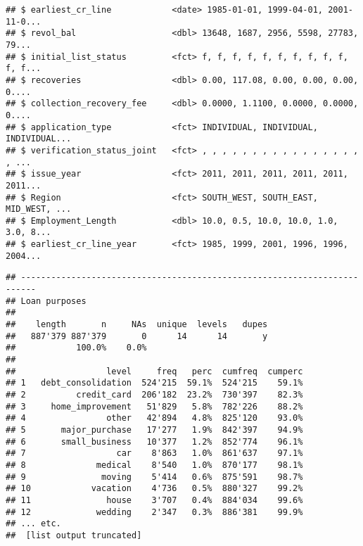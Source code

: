 \documentclass[]{article}
\newenvironment{Shaded}{\begin{snugshade}}{\end{snugshade}}
\newcommand{\KeywordTok}[1]{\textcolor[rgb]{0.13,0.29,0.53}{\textbf{#1}}}
\newcommand{\DataTypeTok}[1]{\textcolor[rgb]{0.13,0.29,0.53}{#1}}
\newcommand{\StringTok}[1]{\textcolor[rgb]{0.31,0.60,0.02}{#1}}
\newcommand{\OtherTok}[1]{\textcolor[rgb]{0.56,0.35,0.01}{#1}}
\newcommand{\OperatorTok}[1]{\textcolor[rgb]{0.81,0.36,0.00}{\textbf{#1}}}
\newcommand{\NormalTok}[1]{#1}
\begin{document}
\begin{verbatim}
## $ earliest_cr_line            <date> 1985-01-01, 1999-04-01, 2001-11-0...
## $ revol_bal                   <dbl> 13648, 1687, 2956, 5598, 27783, 79...
## $ initial_list_status         <fct> f, f, f, f, f, f, f, f, f, f, f, f...
## $ recoveries                  <dbl> 0.00, 117.08, 0.00, 0.00, 0.00, 0....
## $ collection_recovery_fee     <dbl> 0.0000, 1.1100, 0.0000, 0.0000, 0....
## $ application_type            <fct> INDIVIDUAL, INDIVIDUAL, INDIVIDUAL...
## $ verification_status_joint   <fct> , , , , , , , , , , , , , , , , , ...
## $ issue_year                  <fct> 2011, 2011, 2011, 2011, 2011, 2011...
## $ Region                      <fct> SOUTH_WEST, SOUTH_EAST, MID_WEST, ...
## $ Employment_Length           <dbl> 10.0, 0.5, 10.0, 10.0, 1.0, 3.0, 8...
## $ earliest_cr_line_year       <fct> 1985, 1999, 2001, 1996, 1996, 2004...
\end{verbatim}

\begin{Shaded}
\end{Shaded}

\begin{verbatim}
## ------------------------------------------------------------------------- 
## Loan purposes
## 
##    length       n     NAs  unique  levels   dupes
##   887'379 887'379       0      14      14       y
##            100.0%    0.0%                        
## 
##                  level     freq   perc  cumfreq  cumperc
## 1   debt_consolidation  524'215  59.1%  524'215    59.1%
## 2          credit_card  206'182  23.2%  730'397    82.3%
## 3     home_improvement   51'829   5.8%  782'226    88.2%
## 4                other   42'894   4.8%  825'120    93.0%
## 5       major_purchase   17'277   1.9%  842'397    94.9%
## 6       small_business   10'377   1.2%  852'774    96.1%
## 7                  car    8'863   1.0%  861'637    97.1%
## 8              medical    8'540   1.0%  870'177    98.1%
## 9               moving    5'414   0.6%  875'591    98.7%
## 10            vacation    4'736   0.5%  880'327    99.2%
## 11               house    3'707   0.4%  884'034    99.6%
## 12             wedding    2'347   0.3%  886'381    99.9%
## ... etc.
##  [list output truncated]
\end{verbatim}
\end{document}
